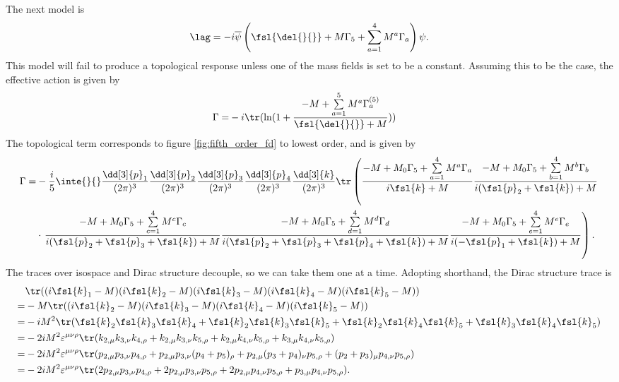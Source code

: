 The next model is
\begin{align*}
	\lag = -i\overline{\psi}\left(\fsl{\del{}{}} + M\Gamma_{5} + \sum\limits_{a = 1}^{4}M^{a}\Gamma_{a}\right)\psi.
\end{align*}
This model will fail to produce a topological response unless one of the mass fields is set to be a constant. Assuming this to be the case, the effective action is given by
\begin{align*}
	\Gamma =& -i\tr(\ln(1 + \frac{-M + \sum\limits_{a = 1}^{5}M^{a}\Gamma_{a}^{(5)}}{\fsl{\del{}{}} + M}))
\end{align*}
The topological term corresponds to figure \ref{fig:fifth_order_fd} to lowest order, and is given by
\begin{align*}
	\Gamma =& -\frac{i}{5}\inte{}{}\frac{\dd[3]{p}_{1}}{(2\pi)^{3}}\frac{\dd[3]{p}_{2}}{(2\pi)^{3}}\frac{\dd[3]{p}_{3}}{(2\pi)^{3}}\frac{\dd[3]{p}_{4}}{(2\pi)^{3}}\frac{\dd[3]{k}}{(2\pi)^{3}}\tr\left(\frac{-M + M_{0}\Gamma_{5} + \sum\limits_{a = 1}^{4}M^{a}\Gamma_{a}}{i\fsl{k} + M}\frac{-M + M_{0}\Gamma_{5} + \sum\limits_{b = 1}^{4}M^{b}\Gamma_{b}}{i(\fsl{p}_{2} + \fsl{k}) + M} \right. \\
	&\cdot\left.\frac{-M + M_{0}\Gamma_{5} + \sum\limits_{c = 1}^{4}M^{c}\Gamma_{c}}{i(\fsl{p}_{2} + \fsl{p}_{3} + \fsl{k}) + M}\frac{-M + M_{0}\Gamma_{5} + \sum\limits_{d = 1}^{4}M^{d}\Gamma_{d}}{i(\fsl{p}_{2} + \fsl{p}_{3} + \fsl{p}_{4} + \fsl{k}) + M}\frac{-M + M_{0}\Gamma_{5} + \sum\limits_{e = 1}^{4}M^{e}\Gamma_{e}}{i(-\fsl{p}_{1} + \fsl{k}) + M}\right).
\end{align*}
The traces over isospace and Dirac structure decouple, so we can take them one at a time. Adopting shorthand, the Dirac structure trace is
\begin{align*}
	 &\tr((i\fsl{k}_{1} - M)(i\fsl{k}_{2} - M)(i\fsl{k}_{3} - M)(i\fsl{k}_{4} - M)(i\fsl{k}_{5} - M)) \\
	=& -M\tr((i\fsl{k}_{2} - M)(i\fsl{k}_{3} - M)(i\fsl{k}_{4} - M)(i\fsl{k}_{5} - M)) \\
	=& -iM^{2}\tr(\fsl{k}_{2}\fsl{k}_{3}\fsl{k}_{4} + \fsl{k}_{2}\fsl{k}_{3}\fsl{k}_{5} + \fsl{k}_{2}\fsl{k}_{4}\fsl{k}_{5} + \fsl{k}_{3}\fsl{k}_{4}\fsl{k}_{5}) \\
	=& -2iM^{2}\varepsilon^{\mu\nu\rho}\tr(k_{2, \mu}k_{3, \nu}k_{4, \rho} + k_{2, \mu}k_{3, \nu}k_{5, \rho} + k_{2, \mu}k_{4, \nu}k_{5, \rho} + k_{3, \mu}k_{4, \nu}k_{5, \rho}) \\
	=& -2iM^{2}\varepsilon^{\mu\nu\rho}\tr(p_{2, \mu}p_{3, \nu}p_{4, \rho} + p_{2, \mu}p_{3, \nu}(p_{4} + p_{5})_{\rho} + p_{2, \mu}(p_{3} + p_{4})_{\nu}p_{5, \rho} + (p_{2} + p_{3})_{\mu}p_{4, \nu}p_{5, \rho}) \\
	=& -2iM^{2}\varepsilon^{\mu\nu\rho}\tr(2p_{2, \mu}p_{3, \nu}p_{4, \rho} + 2p_{2, \mu}p_{3, \nu}p_{5, \rho} + 2p_{2, \mu}p_{4, \nu}p_{5, \rho} + p_{3, \mu}p_{4, \nu}p_{5, \rho}).
\end{align*}
